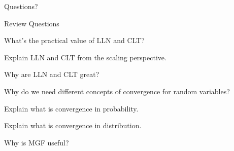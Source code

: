 \begin{comment}
\item<6-> Repeat the above until we check all $\omega \in \Omega.$

\item<7->[$\circ$] If $\cprob{\Omega'} =1$, we achieve almost-sure convergence.
\ece


\eci
\end{frame}

\begin{frame}{Convergence in Probability (2)}

\mycolorbox{
\bci
\item $\bprob{\big \{\omega \in \Omega \mid \lim_{n \rightarrow \infty} Y_n(\omega) = \redf{Y(\omega)} \big\}} = 1$

\item $\bprob{\big \{\omega \in \Omega \mid \lim_{n \rightarrow \infty} Y_n(\omega) = \redf{a} \big\}} = 1$

\eci
}

\plitemsep 0.03in

\bci

\item A special case: when $Y=a$ for some constant $a$: $Y_n \xrightarrow{\text{a.s.}} a$

\item A sequence of iid rvs $X_n \sim \set{U}[0,1]$, and let
$
Y_n = \min\{X_1, X_2, \ldots, X_n \}
$

\item We proved that $Y_n \xrightarrow{\text{in prob.}} 0.$ $Y_n \xrightarrow{\text{a.s.}} 0$?

\item
\eci
\end{frame}
\end{comment}

\begin{frame}{}
\vspace{2cm}
\LARGE Questions?

\end{frame}


\begin{frame}{Review Questions}

\bce[1)]
\item What's the practical value of LLN and CLT?

\item Explain LLN and CLT from the scaling perspective.

\item Why are LLN and CLT great?

\item Why do we need different concepts of convergence for random variables?

\item Explain what is convergence in probability.

\item Explain what is convergence in distribution.

\item Why is MGF useful?

\ece

\end{frame}


